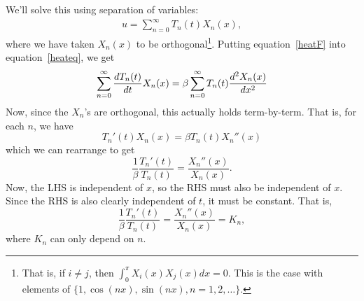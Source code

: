 \documentclass[10pt,driverfallback=hypertex]{report}
\begin{document}
We'll solve this using separation of variables:
\begin{eqnarray}
  \label{heatF}
  u = \sum_{n=0}^\infty T_n(t) X_n(x),
\end{eqnarray}
where we have taken $X_n(x)$ to be orthogonal\footnote{That is, if
  $i\neq j$, then $\int_0^\pi X_i(x) X_j(x) dx =0.$ This is the case
  with elements of $\{1,\cos(nx),\sin(nx),n=1,2,\dots \}$.}.  Putting
equation~\eqref{heatF} into equation~\eqref{heateq}, we get
\begin{eqnarray}
  \label{heats}
  \sum_{n=0}^\infty \frac{dT_n(t)}{dt}X_n(x)
  =\beta\sum_{n=0}^\infty T_n(t)\frac{d^2 X_n(x)}{d x^2}
\end{eqnarray}
Now, since the $X_n$'s are orthogonal, this actually holds term-by-term. That
is, for each $n$, we have
\begin{dmath*}
  T_n'(t)X_n(x) = \beta  T_n(t)X_n''(x)
\end{dmath*}
which we can rearrange to get
\begin{dmath*}
  \frac{1}{\beta}\frac{T_n'(t)}{T_n(t)}= \frac{X_n''(x)}{X_n(x)}.
\end{dmath*}
Now, the LHS is independent of $x$, so the RHS must also be independent of $x$.
Since the RHS is also clearly independent of $t$, it must be constant. That is,
\begin{dmath*}[compact]
  \boxed{
    \frac{1}{\beta}\frac{T_n'(t)}{T_n(t)}
    = \frac{X_n''(x)}{X_n(x)} 
    = K_n,
  }
\end{dmath*}
where $K_n$ can only depend on $n$.
\end{document}
